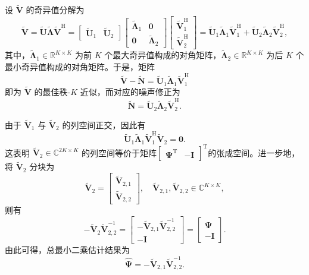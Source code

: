 设 \( \tilde{\mathbf{V}} \) 的奇异值分解为
\[
    \tilde{\mathbf{V}}
    = \tilde{\mathbf{U}} \tilde{\mathbf{\Lambda}} \tilde{\mathbf{V}}^{\mathrm{H}}
    = \begin{bmatrix}
        \tilde{\mathbf{U}}_1 & \tilde{\mathbf{U}}_2
    \end{bmatrix}
    \begin{bmatrix}
        \tilde{\mathbf{\Lambda}}_1 & \mathbf{0}                 \\
        \mathbf{0}                 & \tilde{\mathbf{\Lambda}}_2
    \end{bmatrix}
    \begin{bmatrix}
        \tilde{\mathbf{V}}_1^{\mathrm{H}} \\
        \tilde{\mathbf{V}}_2^{\mathrm{H}}
    \end{bmatrix}
    = \tilde{\mathbf{U}}_1 \tilde{\mathbf{\Lambda}}_1 \tilde{\mathbf{V}}_1^{\mathrm{H}}
    + \tilde{\mathbf{U}}_2 \tilde{\mathbf{\Lambda}}_2 \tilde{\mathbf{V}}_2^{\mathrm{H}},
\]
其中，\( \tilde{\mathbf{\Lambda}}_1 \in \mathbb{R}^{K \times K} \) 为前 \( K \) 个最大奇异值构成的对角矩阵，\( \tilde{\mathbf{\Lambda}}_2 \in \mathbb{R}^{K \times K} \) 为后 \( K \) 个最小奇异值构成的对角矩阵。于是，矩阵
\[
    \tilde{\mathbf{V}} - \tilde{\mathbf{N}} = \tilde{\mathbf{U}}_1 \tilde{\mathbf{\Lambda}}_1 \tilde{\mathbf{V}}_1^{\mathrm{H}}
\]
即为 \( \tilde{\mathbf{V}} \) 的最佳秩-\( K \) 近似，而对应的噪声修正为
\[
    \tilde{\mathbf{N}} = \tilde{\mathbf{U}}_2 \tilde{\mathbf{\Lambda}}_2 \tilde{\mathbf{V}}_2^{\mathrm{H}}.
\]

由于 \(\tilde{\mathbf{V}}_1\) 与 \(\tilde{\mathbf{V}}_2\) 的列空间正交，因此有
\[
    \tilde{\mathbf{U}}_1 \tilde{\mathbf{\Lambda}}_1 \tilde{\mathbf{V}}_1^{\mathrm{H}} \tilde{\mathbf{V}}_2 = \mathbf{0}.
\]
这表明 \(\tilde{\mathbf{V}}_2 \in \mathbb{C}^{2K \times K}\) 的列空间等价于矩阵\(\begin{bmatrix} \mathbf{\Psi}^{\mathrm{T}} & -\mathbf{I} \end{bmatrix}^{\mathrm{T}}\)的张成空间。进一步地，将 \(\tilde{\mathbf{V}}_2\) 分块为
\[
    \tilde{\mathbf{V}}_2 =
    \begin{bmatrix}
        \tilde{\mathbf{V}}_{2,1} \\
        \tilde{\mathbf{V}}_{2,2}
    \end{bmatrix},
    \quad \tilde{\mathbf{V}}_{2,1}, \tilde{\mathbf{V}}_{2,2} \in \mathbb{C}^{K \times K},
\]
则有
\[
    -\tilde{\mathbf{V}}_2 \tilde{\mathbf{V}}_{2,2}^{-1}
    = \begin{bmatrix}
        -\tilde{\mathbf{V}}_{2,1} \tilde{\mathbf{V}}_{2,2}^{-1} \\
        -\mathbf{I}
    \end{bmatrix}
    = \begin{bmatrix}
        \mathbf{\Psi} \\
        -\mathbf{I}
    \end{bmatrix}.
\]
由此可得，总最小二乘估计结果为
\[
    \hat{\mathbf{\Psi}} = -\tilde{\mathbf{V}}_{2,1} \tilde{\mathbf{V}}_{2,2}^{-1}.
\]

